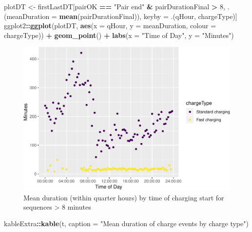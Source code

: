 \documentclass[]{article}
\newenvironment{Shaded}{\begin{snugshade}}{\end{snugshade}}
\newcommand{\KeywordTok}[1]{\textcolor[rgb]{0.13,0.29,0.53}{\textbf{#1}}}
\newcommand{\DataTypeTok}[1]{\textcolor[rgb]{0.13,0.29,0.53}{#1}}
\newcommand{\DecValTok}[1]{\textcolor[rgb]{0.00,0.00,0.81}{#1}}
\newcommand{\StringTok}[1]{\textcolor[rgb]{0.31,0.60,0.02}{#1}}
\newcommand{\OperatorTok}[1]{\textcolor[rgb]{0.81,0.36,0.00}{\textbf{#1}}}
\newcommand{\NormalTok}[1]{#1}
\begin{document}
\begin{Shaded}
\begin{Highlighting}[]
\NormalTok{plotDT <-}\StringTok{ }\NormalTok{firstLastDT[pairOK }\OperatorTok{==}\StringTok{ "Pair end"} \OperatorTok{&}\StringTok{ }\NormalTok{pairDurationFinal }\OperatorTok{>}\StringTok{ }\DecValTok{8}\NormalTok{,}
\NormalTok{                      .(}\DataTypeTok{meanDuration =} \KeywordTok{mean}\NormalTok{(pairDurationFinal)),}
\NormalTok{                      keyby =}\StringTok{ }\NormalTok{.(qHour, chargeType)]}
\NormalTok{ggplot2}\OperatorTok{::}\KeywordTok{ggplot}\NormalTok{(plotDT, }
                \KeywordTok{aes}\NormalTok{(}\DataTypeTok{x =}\NormalTok{ qHour, }\DataTypeTok{y =}\NormalTok{ meanDuration, }\DataTypeTok{colour =}\NormalTok{ chargeType)) }\OperatorTok{+}
\StringTok{  }\KeywordTok{geom_point}\NormalTok{() }\OperatorTok{+}
\StringTok{  }\KeywordTok{labs}\NormalTok{(}\DataTypeTok{x =} \StringTok{"Time of Day"}\NormalTok{,}
       \DataTypeTok{y =} \StringTok{"Minutes"}\NormalTok{)}
\end{Highlighting}
\end{Shaded}

\begin{figure}
\centering
\includegraphics{EVBB_SummaryReport_files/figure-latex/durationTimeMean-1.pdf}
\caption{\label{fig:durationTimeMean}Mean duration (within quarter hours) by
time of charging start for sequences \textgreater{} 8 minutes}
\end{figure}

\begin{Shaded}
\begin{Highlighting}[]
\NormalTok{kableExtra}\OperatorTok{::}\KeywordTok{kable}\NormalTok{(t, }\DataTypeTok{caption =} \StringTok{"Mean duration of charge events by charge type"}\NormalTok{)}
\end{Highlighting}
\end{Shaded}
\end{document}
